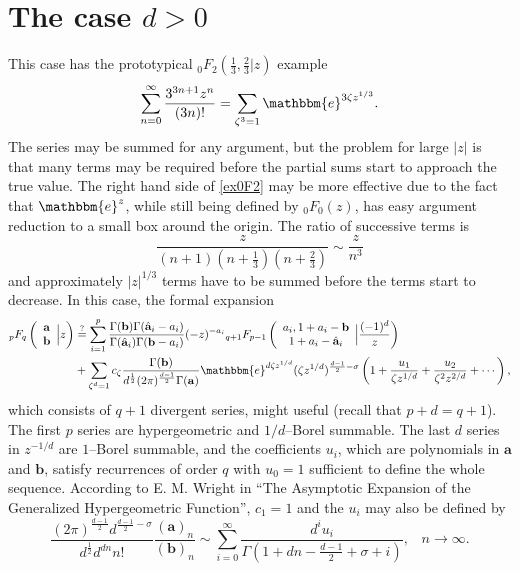 \documentclass[12pt]{article}
\newcommand{\ee}[0] {\mathbbm{e}}
\numberwithin{equation}{section}
\newcommand{\FF}[6] {{}_{#1}{#2}_{#3} \left( \begin{array}{c} #4 \\ #5 \end{array} \Big| {#6}  \right)}
\newcommand{\FFf}[5] {{}_{#1}{#2}_{#3} \left(#4 | {#5} \right)}
\newcommand{\bfa}[0] {\mathbf{a}}
\newcommand{\bfb}[0] {\mathbf{b}}
\begin{document}
\section{The case $d>0$}
This case has the prototypical $\FFf{0}{F}{2}{\tfrac13, \tfrac23}{z}$ example
\begin{equation}
\label{ex0F2}
\sum_{n=0}^{\infty}\frac{3^{3n+1}z^n}{(3n)!} = \sum_{\zeta^3=1} \ee^{3\zeta z^{1/3}}\text{.}
\end{equation}
The series may be summed for any argument, but the problem for large $|z|$ is that many terms may be required before the partial sums start to approach the true value. The right hand side of \eqref{ex0F2} may be more effective due to the fact that $\ee^{z}$, while still being defined by ${}_0 F_0(z)$, has easy argument reduction to a small box around the origin. The ratio of successive terms is
\begin{equation*}
\frac{z}{(n+1) (n+\frac{1}{3}) (n+\frac{2}{3})} \sim \frac{z}{n^3}
\end{equation*}
and approximately $|z|^{1/3}$ terms have to be summed before the terms start to decrease. In this case, the formal expansion
\begin{equation}
\label{entirerecp}
\begin{alignedat}{1}
\FF{p}{F}{q}{\mathbf{a}}{\mathbf{b}}{z}&\overset{?}{=}\sum_{i=1}^{p} \frac{\Gamma(\mathbf{b}) \Gamma(\hat{\mathbf{a}}_i-a_i)}{\Gamma(\hat{\mathbf{a}}_i)\Gamma(\mathbf{b}-a_i)} (-z)^{-a_i} \FF{q+1}{F}{p-1}{a_i,1+a_i-\mathbf{b}}{1+a_i-\hat{\mathbf{a}}_i}{\frac{(-1)^d}{z}}\\
&+\sum_{\zeta^d=1} c_{\zeta} \frac{\Gamma(\mathbf{b})}{d^{\frac{1}{2}} (2 \pi )^{\frac{d-1}{2}} \Gamma(\mathbf{a})} \ee^{d \zeta z^{1/d}}(\zeta z^{1/d})^{\frac{d-1}{2}-\sigma} \left(1+\frac{u_1}{\zeta z^{1/d}}+\frac{u_2}{\zeta^2 z^{2/d}}+\cdots\right)\text{,}
\end{alignedat}
\end{equation}
which consists of $q+1$ divergent series, might useful (recall that $p+d=q+1$). The first $p$ series are hypergeometric and $1/d$--Borel summable. The last $d$ series in $z^{-1/d}$ are $1$--Borel summable, and the coefficients $u_i$, which are polynomials in $\mathbf{a}$ and $\mathbf{b}$, satisfy recurrences of order $q$ with $u_0=1$ sufficient to define the whole sequence. According to E. M. Wright in ``The Asymptotic Expansion of the Generalized Hypergeometric Function'', $c_{1}=1$ and the $u_i$ may also be defined by
\begin{equation*}
\frac{(2 \pi )^{\frac{d-1}{2}} d^{\frac{d-1}{2}-\sigma
   }}{d^{\frac12} d^{dn}n!}\frac{(\bfa)_n}{(\bfb)_n} \sim \sum_{i=0}^{\infty}\frac{d^i u_i}{\Gamma \left(1+d
   n-\frac{d-1}{2}+\sigma+i\right)}\text{,} \quad n \to \infty\text{.}
\end{equation*}
\end{document}

